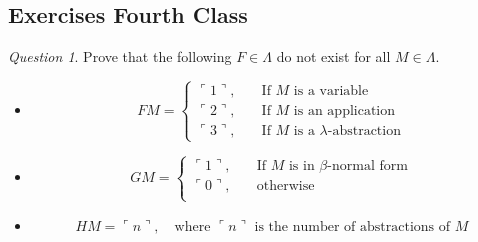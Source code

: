 \documentclass[11pt]{article}
\theoremstyle{definition}
\theoremstyle{remark}
\theoremstyle{remark}
\newtheorem{question}{Question}
\theoremstyle{definition}
\newcommand{\ch}[1]{\ulcorner #1 \urcorner}
\begin{document}
\subsection{Exercises Fourth Class}
\begin{question}
  Prove that the following $F \in \Lambda$ do not exist for all $M \in \Lambda$.
  \begin{itemize}
    \item
          \begin{equation*}
            FM =
            \begin{cases}
              \ch{1}, &\quad \text{If } M \text{ is a variable} \\
              \ch{2}, &\quad \text{If } M \text{ is an application} \\
              \ch{3}, &\quad \text{If } M \text{ is a
              } \lambda \text{-abstraction}
            \end{cases}
          \end{equation*}
    \item
          \begin{equation*}
            GM =
            \begin{cases}
              \ch{1}, &\quad \text{If } M \text{ is in } \beta \text{-normal form} \\
              \ch{0}, &\quad \text{otherwise} \\
            \end{cases}
          \end{equation*}
    \item
          \begin{equation*}
            HM = \ch{n}, \quad \text{where } \ch{n}
            \text{ is the number of abstractions of } M
          \end{equation*}
  \end{itemize}
\end{question}
\end{document}
